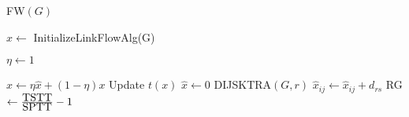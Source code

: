 \begin{algorithm}
\caption{FW$(G)$}
\label{alg:fw}
\begin{algorithmic}[1]
\STATE  $\hat{x}\leftarrow$ InitializeLinkFlowAlg(G)

		\STATE $\eta\leftarrow 1$
	\ELSE
	\ENDIF

	\STATE $x\leftarrow \eta\hat{x} + (1-\eta)x$
	\STATE Update $t(x)$
	\STATE $\hat{x}\leftarrow 0$
		\STATE DIJSKTRA$(G, r)$
			\STATE $\hat{x}_{ij} \leftarrow \hat{x}_{ij}+d_{rs}$
		\ENDFOR
	\ENDFOR
	\STATE RG $\leftarrow \frac{\hbox{TSTT}}{\hbox{SPTT}} - 1$
\ENDWHILE
\end{algorithmic}
\end{algorithm}
